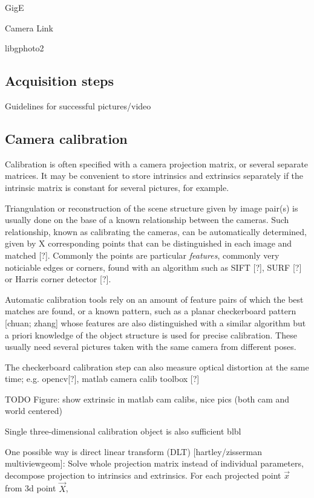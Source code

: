 GigE

Camera Link

libgphoto2

\subsection{Acquisition steps}

Guidelines for successful pictures/video

\subsection{Camera calibration}

Calibration is often specified with a camera projection matrix, or several separate matrices. It may be convenient to store intrinsics and extrinsics separately if the intrinsic matrix is constant for several pictures, for example.

Triangulation or reconstruction of the scene structure given by image pair(s) is usually done on the base of a known relationship between the cameras. Such relationship, known as calibrating the cameras, can be automatically determined, given by X corresponding points that can be distinguished in each image and matched [?]. Commonly the points are particular \emph{features}, commonly very noticiable edges or corners, found with an algorithm such as SIFT [?], SURF [?] or Harris corner detector [?].

Automatic calibration tools rely on an amount of feature pairs of which the best matches are found, or a known pattern, such as a planar checkerboard pattern [chuan; zhang] whose features are also distinguished with a similar algorithm but a priori knowledge of the object structure is used for precise calibration. These usually need several pictures taken with the same camera from different poses.

The checkerboard calibration step can also measure optical distortion at the same time; e.g. opencv[?], matlab camera calib toolbox [?]

TODO Figure: show extrinsic in matlab cam calibs, nice pics (both cam and world centered)

Single three-dimensional calibration object is also sufficient blbl

One possible way is direct linear transform (DLT) [hartley/zisserman multiviewgeom]: Solve whole projection matrix instead of individual parameters, decompose projection to intrinsics and extrinsics. For each projected point $\vec x$ from 3d point $\vec X$,

